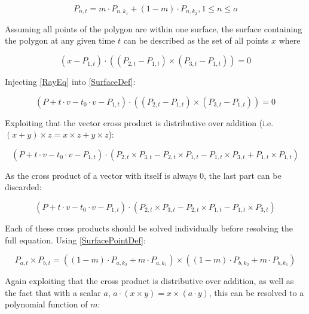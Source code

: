 \begin{equation}\label{SurfacePointDef}
    P_{n, t} = m \cdot P_{n, k_1} + (1 - m) \cdot P_{n, k_2}, 1 \le n \le o
\end{equation}

Assuming all points of the polygon are within one surface,
the surface containing the polygon at any given time \(t\) can be described as the set of all points \(x\) where

\begin{equation}\label{SurfaceDef}
    (x - P_{1, t}) \cdot ((P_{2, t} - P_{1, t}) \times (P_{3, t} - P_{1, t})) = 0
\end{equation}

Injecting \eqref{RayEq} into \eqref{SurfaceDef}:

\begin{equation}
    (P + t \cdot v - t_0 \cdot v - P_{1, t}) \cdot ((P_{2, t} - P_{1, t}) \times (P_{3, t} - P_{1, t})) = 0
\end{equation}

Exploiting that the vector cross product is distributive over addition (i.e. \( (x + y) \times z = x \times z + y \times z\)):

\begin{equation*}
    (P + t \cdot v - t_0 \cdot v - P_{1, t}) \cdot
    (P_{2, t} \times P_{3, t} - P_{2, t} \times P_{1, t} - P_{1, t} \times P_{3, t} + P_{1, t} \times P_{1, t})
\end{equation*}

As the cross product of a vector with itself is always 0, the last part can be discarded:

\begin{equation}\label{SurfaceBeforeCross}
    (P + t \cdot v - t_0 \cdot v - P_{1, t}) \cdot
    (P_{2, t} \times P_{3, t} - P_{2, t} \times P_{1, t} - P_{1, t} \times P_{3, t})
\end{equation}

Each of these cross products should be solved individually before resolving the full equation.
Using \eqref{SurfacePointDef}:

\begin{equation}
    P_{a, t} \times P_{b, t}
    = ((1-m) \cdot P_{a, k_2} + m \cdot P_{a, k_1}) \times ((1-m) \cdot P_{b, k_2} + m \cdot P_{b, k_1})
\end{equation}

Again exploiting that the cross product is distributive over addition, as well as the fact that with a scalar \(a\),
\(a \cdot (x \times y) = x \times (a \cdot y)\), this can be resolved to a polynomial function of \(m\):

